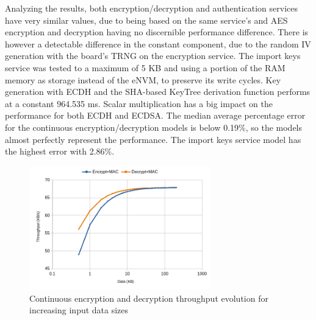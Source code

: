 Analyzing the results, both encryption/decryption and authentication services have very similar values, due to being based on the same service's and AES encryption and decryption having no discernible performance difference.
There is however a detectable difference in the constant component, due to the random IV generation with the board's TRNG on the encryption service.
The import keys service was tested to a maximum of 5 KB and using a portion of the RAM memory as storage instead of the eNVM, to preserve its write cycles.
Key generation with ECDH and the SHA-based KeyTree derivation function performs at a constant 964.535 ms.
Scalar multiplication has a big impact on the performance for both ECDH and ECDSA.
The median average percentage error for the continuous encryption/decryption models is below 0.19\%, so the models almost perfectly represent the performance. The import keys service model has the highest error with 2.86\%.

\begin{figure}[h!]
	\centering
	\includegraphics[width=0.7\textwidth]{./Images/services-tput.png}
	\caption{Continuous encryption and decryption throughput evolution for increasing input data sizes}
	\label{fig:performance:services-tput}
\end{figure}

